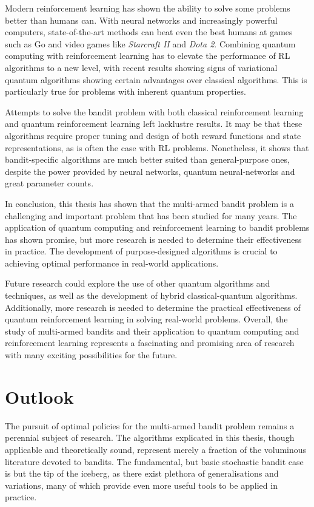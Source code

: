 Modern reinforcement learning has shown the ability to solve some problems better than humans can.
With neural networks and increasingly powerful computers, state-of-the-art methods can beat even the best humans at games such as Go and video games like \textit{Starcraft II} and \textit{Dota 2}.
Combining quantum computing with reinforcement learning has to elevate the performance of RL algorithms to a new level, with recent results showing signs of variational quantum algorithms showing certain advantages over classical algorithms.
This is particularly true for problems with inherent quantum properties.

Attempts to solve the bandit problem with both classical reinforcement learning and quantum reinforcement learning left lacklustre results.
It may be that these algorithms require proper tuning and design of both reward functions and state representations, as is often the case with RL problems.
Nonetheless, it shows that bandit-specific algorithms are much better suited than general-purpose ones, despite the power provided by neural networks, quantum neural-networks and great parameter counts.

In conclusion, this thesis has shown that the multi-armed bandit problem is a challenging and important problem that has been studied for many years. The application of quantum computing and reinforcement learning to bandit problems has shown promise, but more research is needed to determine their effectiveness in practice. The development of purpose-designed algorithms is crucial to achieving optimal performance in real-world applications.

Future research could explore the use of other quantum algorithms and techniques, as well as the development of hybrid classical-quantum algorithms. Additionally, more research is needed to determine the practical effectiveness of quantum reinforcement learning in solving real-world problems. Overall, the study of multi-armed bandits and their application to quantum computing and reinforcement learning represents a fascinating and promising area of research with many exciting possibilities for the future.

\section{Outlook}
The pursuit of optimal policies for the multi-armed bandit problem remains a perennial subject of research.
The algorithms explicated in this thesis, though applicable and theoretically sound, represent merely a fraction of the voluminous literature devoted to bandits.
The fundamental, but basic stochastic bandit case is but the tip of the iceberg, as there exist plethora of generalisations and variations, many of which provide even more useful tools to be applied in practice.


